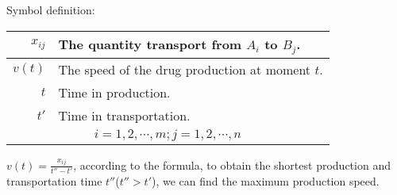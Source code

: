 Symbol definition:
\begin{center}
\begin{tabular}{|r|p{8cm}|}
\hline
$ x_{ij} $ & The quantity transport from $ A_i $ to
$ B_j $.\\
\hline
$ v(t) $ & The speed of the drug production at moment $t$.\\
\hline
$ t $ & Time in production.\\
\hline
$ t' $ & Time in transportation.\\
\hline
\multicolumn{2}{|c|}{$ i=1,2,\cdots,m;j=1,2,\cdots,n $}\\
\hline
\end{tabular}
\end{center}%
$v(t)=\frac{x_{ij}}{t''-t'}$, according to the formula, to
obtain the shortest production and transportation time
$t''$($t''>t'$), we can find the maximum production speed.
